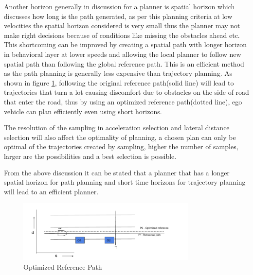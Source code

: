  Another horizon generally in discussion for a planner is spatial horizon which discusses how long is the path generated, as per this planning criteria at low velocities the spatial horizon considered is very small thus the planner may not make right decisions because of conditions like missing the obstacles ahead etc. This shortcoming can be improved by creating a spatial path with longer horizon in behavioral layer at lower speeds and allowing the local planner to follow new spatial path than following the global reference path. This is an efficient method as the path planning is generally less expensive than trajectory planning. As shown in figure \ref{optimized_reference}, following the original reference path(solid line) will lead to trajectories that turn a lot causing discomfort due to obstacles on the side of road that enter the road, thus by using an optimized reference path(dotted line), ego vehicle can plan efficiently even using short horizons.
 
 The resolution of the sampling in acceleration selection and lateral distance selection will also affect the optimality of planning, a chosen plan can only be optimal of the trajectories created by sampling, higher the number of samples, larger are the possibilities and a best selection is possible. 
 
 From the above discussion it can be stated that a planner that has a longer spatial horizon for path planning and short time horizons for trajectory planning will lead to an efficient planner. 
 
 \begin{figure}[h]
    \centering
    \includegraphics[width=0.8\textwidth]{Images/optimized_reference.png}
    \caption{Optimized Reference Path}
    \label{optimized_reference}
\end{figure}

